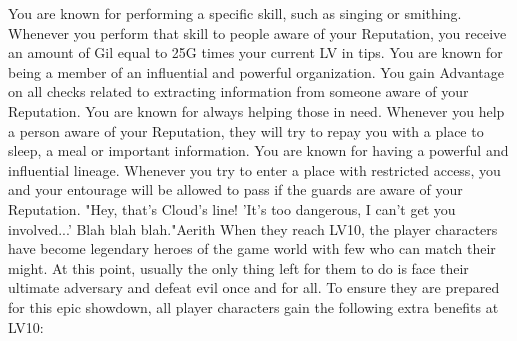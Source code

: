 %
You are known for performing a specific skill, such as singing or smithing. 
Whenever you perform that skill to people aware of your Reputation, you receive an amount of Gil equal to 25G times your current LV in tips. \ofrow
%
You are known for being a member of an influential and powerful organization. 
You gain Advantage on all checks related to extracting information from someone aware of your Reputation. \ofrow
%
You are known for always helping those in need. 
Whenever you help a person aware of your Reputation, they will try to repay you with a place to sleep, a meal or important information. \ofrow
%
You are known for having a powerful and influential lineage. 
Whenever you try to enter a place with restricted access, you and your entourage will be allowed to pass if the guards are aware of your Reputation.
%
\vfill
%
%
%
%
\vfill
%
%
{"Hey, that’s Cloud’s line! ’It’s too dangerous, I can’t get you involved...’ Blah blah blah."}{Aerith}{
	When they reach LV10, the player characters have become legendary heroes of the game world with few who can match their might.
	At this point, usually the only thing left for them to do is face their ultimate adversary and defeat evil once and for all.
	To ensure they are prepared for this epic showdown, all player characters gain the following extra benefits at LV10:\ofrow
}
%
\clearpage
%
%
